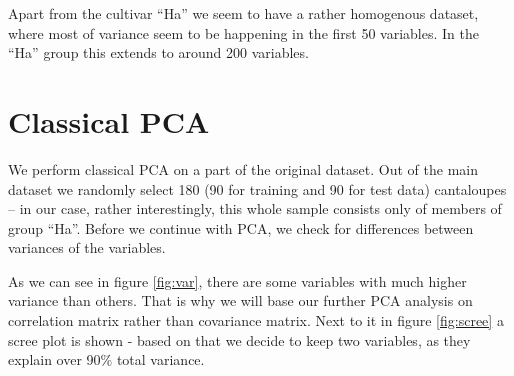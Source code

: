 \documentclass[12pt]{article}
\begin{document}
Apart from the cultivar ``Ha'' we seem to have a rather homogenous dataset, where most of variance seem to be happening in the first 50 variables. In the ``Ha'' group this 
extends to around 200 variables.

\section{Classical PCA} \label{classicPCA}
We perform classical PCA on a part of the original dataset. Out of the main dataset we randomly select 180 (90 for training and 90 for test data) cantaloupes -- in our case,
rather interestingly, this whole sample consists only of members of group ``Ha''. Before we continue with PCA, we check for differences between variances of the variables.

As we can see in figure \ref{fig:var}, there are some variables with much higher variance than others. That is why we will base our further PCA analysis on correlation matrix rather than
covariance matrix. Next to it in figure \ref{fig:scree} a scree plot is shown - based on that we decide to keep two variables, as they explain over 90\% total variance.
\end{document}
